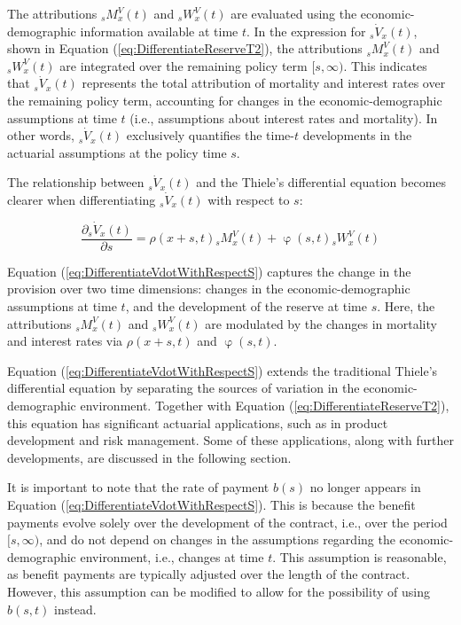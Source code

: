 \documentclass[12pt]{article}
\begin{document}
{The attributions ${}_sM^V_x(t)$ and ${}_sW^V_x(t)$ are evaluated using the economic-demographic information available at time \( t \). In the expression for ${}_s\dot{V}_x(t)$, shown in Equation (\ref{eq:DifferentiateReserveT2}), the attributions ${}_sM^V_x(t)$ and ${}_sW^V_x(t)$ are integrated over the remaining policy term \( [s, \infty) \). This indicates that ${}_s\dot{V}_x(t)$ represents the total attribution of mortality and interest rates over the remaining policy term, accounting for changes in the economic-demographic assumptions at time \( t \) (i.e., assumptions about interest rates and mortality). In other words, ${}_s\dot{V}_x(t)$ exclusively quantifies the time-\( t \) developments in the actuarial assumptions at the policy time \( s \).

 
The relationship between ${}_s\dot{V}_x(t)$ and the Thiele's differential equation becomes clearer when differentiating ${}_s\dot{V}_x(t)$ with respect to $s$: 

\begin{equation}\label{eq:DifferentiateVdotWithRespectS}
\dfrac{\partial	{}_s\dot{V}_x(t)}{\partial s}= \rho(x+s,t) {}_sM^V_x(t)+ \upvarphi(s,t) {}_sW^V_x(t)
\end{equation}

Equation (\ref{eq:DifferentiateVdotWithRespectS}) captures the change in the provision over two time dimensions: changes in the economic-demographic assumptions at time \( t \), and the development of the reserve at time \( s \). Here, the attributions \( {}_sM^V_x(t) \) and \( {}_sW^V_x(t) \) are modulated by the changes in mortality and interest rates via \( \rho(x+s,t) \) and \( \upvarphi(s,t) \).

Equation (\ref{eq:DifferentiateVdotWithRespectS}) extends the traditional Thiele’s differential equation by separating the sources of variation in the economic-demographic environment. Together with Equation (\ref{eq:DifferentiateReserveT2}), this equation has significant actuarial applications, such as in product development and risk management. Some of these applications, along with further developments, are discussed in the following section.

It is important to note that the rate of payment \( b(s) \) no longer appears in Equation (\ref{eq:DifferentiateVdotWithRespectS}). This is because the benefit payments evolve solely over the development of the contract, i.e., over the period \( [s, \infty) \), and do not depend on changes in the assumptions regarding the economic-demographic environment, i.e., changes at time \( t \). This assumption is reasonable, as benefit payments are typically adjusted over the length of the contract. However, this assumption can be modified to allow for the possibility of using \( b(s,t) \) instead.

}
\end{document}
